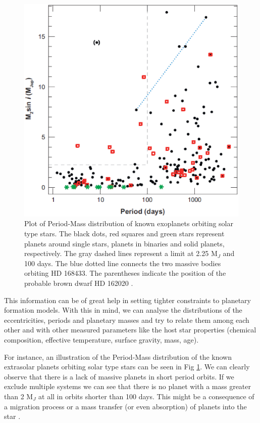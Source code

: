 \documentclass[dvips,12pt,a4paper]{report}
\begin{document}
\begin{figure}[h]
\centering
\includegraphics[trim=0cm 0.3cm 0cm 0.4cm,clip,height=9 cm]{pics/massplanet3}
\caption[Period Mass distributions of known extrasolar planets ]{Plot of Period-Mass distribution of known exoplanets orbiting solar type stars. The black dots, red squares and green stars represent planets around single stars, planets in binaries and solid planets, respectively. The gray dashed lines represent a limit at 2.25 M$_{J}$ and 100 days. The blue dotted line connects the two massive bodies orbiting HD 168433. The parentheses indicate the position of the probable brown dwarf HD 162020 \citep{Udry-2007}. }
\label{planetmass}
\end{figure}

This information can be of great help in setting tighter constraints to planetary formation models. With this in mind, we can analyse the distributions of the eccentricities, periods and planetary masses and try to relate them among each other and with other measured parameters like the host star properties (chemical composition, effective temperature, surface gravity, mass, age).

For instance, an illustration of the Period-Mass distribution of the known extrasolar planets orbiting solar type stars can be seen in Fig \ref{planetmass}. We can clearly observe that there is a lack of massive planets in short period orbits. If we exclude multiple systems we can see that there is no planet with a mass greater than 2 M$_{J}$ at all in orbits shorter than 100 days. This might be a consequence of a migration process or a mass transfer (or even absorption) of planets into the star \citep[e.g.][]{Trilling-1998}. %
\end{document}

